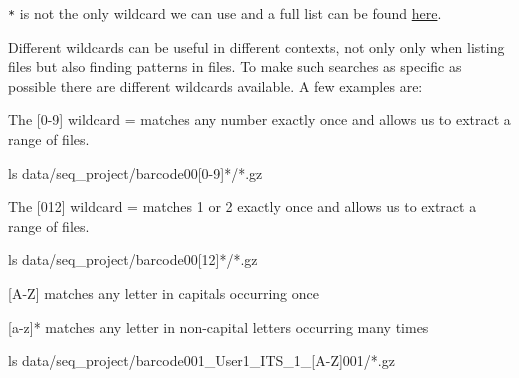 \documentclass[
  letterpaper,
  DIV=11,
  numbers=noendperiod]{scrreprt}
\newenvironment{Shaded}{}{}
\newcommand{\FunctionTok}[1]{\textcolor[rgb]{0.44,0.26,0.76}{#1}}
\newcommand{\NormalTok}[1]{\textcolor[rgb]{0.14,0.16,0.18}{#1}}
\newcommand{\PreprocessorTok}[1]{\textcolor[rgb]{0.84,0.23,0.29}{#1}}
\newcommand{\SpecialStringTok}[1]{\textcolor[rgb]{0.01,0.18,0.38}{#1}}
\begin{document}
\begin{tcolorbox}[enhanced jigsaw, title=\textcolor{quarto-callout-tip-color}{\faLightbulb}\hspace{0.5em}{Tip: More wildcards}, colframe=quarto-callout-tip-color-frame, opacitybacktitle=0.6, rightrule=.15mm, arc=.35mm, left=2mm, colbacktitle=quarto-callout-tip-color!10!white, bottomrule=.15mm, leftrule=.75mm, toprule=.15mm, opacityback=0, bottomtitle=1mm, colback=white, toptitle=1mm, breakable, titlerule=0mm, coltitle=black]

\texttt{*} is not the only wildcard we can use and a full list can be
found
\href{https://tldp.org/LDP/GNU-Linux-Tools-Summary/html/x11655.htm}{here}.

Different wildcards can be useful in different contexts, not only only
when listing files but also finding patterns in files. To make such
searches as specific as possible there are different wildcards
available. A few examples are:

The {[}0-9{]} wildcard = matches any number exactly once and allows us
to extract a range of files.

\begin{Shaded}
\begin{Highlighting}[]
\FunctionTok{ls}\NormalTok{ data/seq\_project/barcode00}\PreprocessorTok{[}\SpecialStringTok{0}\PreprocessorTok{{-}}\SpecialStringTok{9}\PreprocessorTok{]*}\NormalTok{/}\PreprocessorTok{*}\NormalTok{.gz}
\end{Highlighting}
\end{Shaded}

The {[}012{]} wildcard = matches 1 or 2 exactly once and allows us to
extract a range of files.

\begin{Shaded}
\begin{Highlighting}[]
\FunctionTok{ls}\NormalTok{ data/seq\_project/barcode00}\PreprocessorTok{[}\SpecialStringTok{12}\PreprocessorTok{]*}\NormalTok{/}\PreprocessorTok{*}\NormalTok{.gz}
\end{Highlighting}
\end{Shaded}

{[}A-Z{]} matches any letter in capitals occurring once

{[}a-z{]}* matches any letter in non-capital letters occurring many
times

\begin{Shaded}
\begin{Highlighting}[]
\FunctionTok{ls}\NormalTok{ data/seq\_project/barcode001\_User1\_ITS\_1\_}\PreprocessorTok{[}\SpecialStringTok{A}\PreprocessorTok{{-}}\SpecialStringTok{Z}\PreprocessorTok{]}\NormalTok{001/}\PreprocessorTok{*}\NormalTok{.gz}
\end{Highlighting}
\end{Shaded}

\end{tcolorbox}
\end{document}
